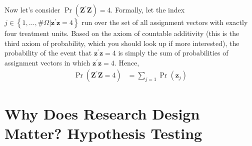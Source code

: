 \documentclass[12pt,leqno]{article}
\newenvironment{Shaded}{\begin{snugshade}}{\end{snugshade}}
\newcommand{\ControlFlowTok}[1]{\textcolor[rgb]{0.13,0.29,0.53}{\textbf{#1}}}
\newcommand{\DataTypeTok}[1]{\textcolor[rgb]{0.13,0.29,0.53}{#1}}
\newcommand{\DecValTok}[1]{\textcolor[rgb]{0.00,0.00,0.81}{#1}}
\newcommand{\KeywordTok}[1]{\textcolor[rgb]{0.13,0.29,0.53}{\textbf{#1}}}
\newcommand{\NormalTok}[1]{#1}
\newcommand{\OperatorTok}[1]{\textcolor[rgb]{0.81,0.36,0.00}{\textbf{#1}}}
\newcommand{\StringTok}[1]{\textcolor[rgb]{0.31,0.60,0.02}{#1}}
\theoremstyle{newstyle}
\begin{document}
Now let's consider
\(\Pr\left(\mathbf{Z}^{\prime}\mathbf{Z}\right) = 4\). Formally, let the
index
\(j \in \left\{1, \dots, \#\Omega \vert \mathbf{z}^{\prime}\mathbf{z} = 4\right\}\)
run over the set of all assignment vectors with exactly four treatment
units. Based on the axiom of countable additivity (this is the third
axiom of probability, which you should look up if more interested), the
probability of the event that \(\mathbf{z}^{\prime}\mathbf{z} = 4\) is
simply the sum of probabilities of assignment vectors in which
\(\mathbf{z}^{\prime}\mathbf{z} = 4\). Hence, \begin{align*}
\Pr\left(\mathbf{Z}^{\prime}\mathbf{Z} = 4\right) & = \sum_{j = 1} \Pr\left(\mathbf{z}_j\right) 
\end{align*}

\begin{Shaded}
\end{Shaded}

\hypertarget{why-does-research-design-matter-hypothesis-testing}{%
\section{Why Does Research Design Matter? Hypothesis
Testing}\label{why-does-research-design-matter-hypothesis-testing}}
\end{document}

